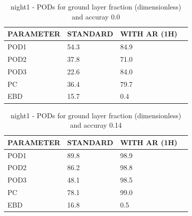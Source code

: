 \begin{table}[p!]
\begin{center}
\begin{tabular}{|l|l|l|l|}
\hline
\multicolumn{1}{|c|}{\cellcolor[HTML]{C0C0C0}\textbf{PARAMETER}} & \multicolumn{1}{c|}{\cellcolor[HTML]{C0C0C0}\textbf{STANDARD}} & \multicolumn{1}{c|}{\cellcolor[HTML]{C0C0C0}\textbf{WITH AR (1H)}} \\
\hline
\cellcolor[HTML]{C0C0C0}POD1  & 54.3                                & 84.9         \\
\cellcolor[HTML]{C0C0C0}POD2  & 37.8                                & 71.0         \\
\cellcolor[HTML]{C0C0C0}POD3  & 22.6                                & 84.0         \\
\cellcolor[HTML]{C0C0C0}PC    & 36.4                                  & 79.7           \\
\cellcolor[HTML]{C0C0C0}EBD   & 15.7                                 & 0.4          \\
\hline
\end{tabular}
\caption{night1 - PODs for ground layer fraction (dimensionless) and accuray 0.0}
\label{tab:podglf0.0:night1}
\end{center}
\end{table}
\begin{table}[p!]
\begin{center}
\begin{tabular}{|l|l|l|l|}
\hline
\multicolumn{1}{|c|}{\cellcolor[HTML]{C0C0C0}\textbf{PARAMETER}} & \multicolumn{1}{c|}{\cellcolor[HTML]{C0C0C0}\textbf{STANDARD}} & \multicolumn{1}{c|}{\cellcolor[HTML]{C0C0C0}\textbf{WITH AR (1H)}} \\
\hline
\cellcolor[HTML]{C0C0C0}POD1  & 89.8                                & 98.9         \\
\cellcolor[HTML]{C0C0C0}POD2  & 86.2                                & 98.8         \\
\cellcolor[HTML]{C0C0C0}POD3  & 48.1                                & 98.5         \\
\cellcolor[HTML]{C0C0C0}PC    & 78.1                                  & 99.0           \\
\cellcolor[HTML]{C0C0C0}EBD   & 16.8                                 & 0.5          \\
\hline
\end{tabular}
\caption{night1 - PODs for ground layer fraction (dimensionless) and accuray 0.14}
\label{tab:podglf0.14:night1}
\end{center}
\end{table}
